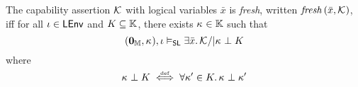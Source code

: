 %
%
\begin{definition}[Freshness]
The capability assertion $\mathcal{K}_{}$ with logical variables $\bar{x}$ is \emph{fresh}, written $\mathit{fresh}\left(\bar{x}, \mathcal{K}_{}\right)$, iff for all $\iota \in \textsf{LEnv}$ and $K \subseteq \mathbb{K}$, there exists $\kappa_{} \in \mathbb{K}$ such that
%
\[
	(\mathbf{0}_{\mathbb{M}}, \kappa_{}), \iota \mathrel{\vDash_{\mathsf{SL}}} \exists \bar{x}.\, \mathcal{K}_{} /|  \kappa_{} \mathrel{\bot} K
\]
%	
where 
\[
	\kappa_{} \mathrel{\bot} K \mathrel{\stackrel{\smash{\scriptscriptstyle{\mathrm{def}}}}{\iff}} \forall \kappa_{}' \in K.\, \kappa_{} \mathrel{\bot} \kappa_{}'
\]
%
%
\end{definition}
%
%
